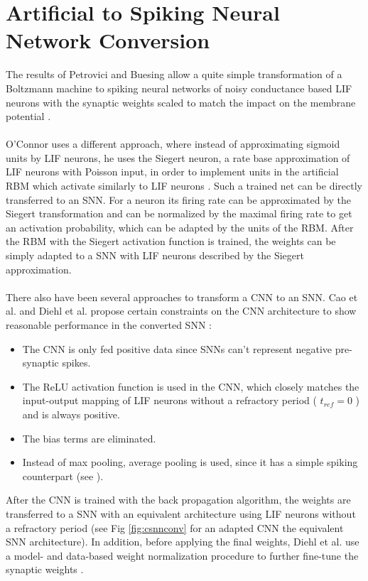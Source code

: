\section{Artificial to Spiking Neural Network Conversion} \label{c:nnconversion}

The results of Petrovici and Buesing allow a quite simple transformation of a Boltzmann machine to spiking neural networks of noisy conductance based LIF neurons with the synaptic weights scaled to match the impact on the membrane potential \cite{Petrovici2016}.
\\
\\
O'Connor uses a different approach, where instead of approximating sigmoid units by LIF neurons, he uses the Siegert neuron, a rate base approximation of LIF neurons with Poisson input, in order to implement units in the artificial RBM which activate similarly to LIF neurons \cite{OConnor2013}. 
Such a trained net can be directly transferred to an SNN.
For a neuron its firing rate can be approximated by the Siegert transformation and can be normalized by the maximal firing rate to get an activation probability, which can be adapted by the units of the RBM. 
After the RBM with the Siegert activation function is trained, the weights can be simply adapted to a SNN with LIF neurons described by the Siegert approximation.
\\
\\
There also have been several approaches to transform a CNN to an SNN.  
Cao et al. and Diehl et al. propose certain constraints on the CNN architecture to show reasonable performance in the converted SNN \cite{Cao2014}\cite{Diehl2015}:
\begin{itemize}
\item The CNN is only fed positive data since SNNs can't represent negative pre-synaptic spikes. 
\item The ReLU activation function is used in the CNN, which closely matches the input-output mapping of LIF neurons without a refractory period ( $t_{ref}=0$ ) and is always positive.
\item The bias terms are eliminated.
\item Instead of max pooling, average pooling is used, since it has a simple spiking counterpart (see \cite{Cao2014}).
\end{itemize}
After the CNN is trained with the back propagation algorithm, the weights are transferred to a SNN with an equivalent architecture using LIF neurons without a refractory period (see Fig \ref{fig:csnnconv} for an adapted CNN the equivalent SNN architecture). 
In addition, before applying the final weights, Diehl et al. use a model- and data-based weight normalization procedure to further fine-tune the synaptic weights \cite{Diehl2015}. 


